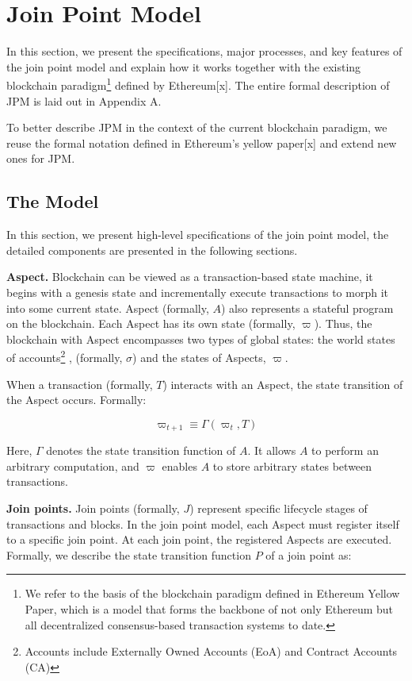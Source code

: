 \section{Join Point Model}

In this section, we present the specifications, major processes, and key features of the join point model and explain how it works together with the existing blockchain paradigm\footnote{We refer to the basis of the blockchain paradigm defined in Ethereum Yellow Paper, which is a model that forms the backbone of not only Ethereum but all decentralized consensus-based transaction systems to date.} defined by Ethereum[x]. The entire formal description of JPM is laid out in Appendix A.

To better describe JPM in the context of the current blockchain paradigm, we reuse the formal notation defined in Ethereum's yellow paper[x] and extend new ones for JPM.

\subsection{The Model}

In this section, we present high-level specifications of the join point model, the detailed components are presented in the following sections.

\textbf{Aspect.} Blockchain can be viewed as a transaction-based state machine, it begins with a genesis state and incrementally execute transactions to morph it into some current state. Aspect (formally, $A$) also represents a stateful program on the blockchain. Each Aspect has its own state (formally, $\varpi$). Thus, the blockchain with Aspect encompasses two types of global states: the world states of accounts\footnote{Accounts include Externally Owned Accounts (EoA) and Contract Accounts (CA)} , (formally,  $\sigma$) and the states of Aspects, $\varpi$. 

When a transaction (formally, $T$) interacts with an Aspect, the state transition of the Aspect occurs. Formally: 

$$
\varpi_{t+1} \equiv \Gamma(\varpi_{t},T) 
$$

Here, $\Gamma$ denotes the state transition function of $A$. It allows $A$ to perform an arbitrary computation, and $\varpi$ enables $A$ to store arbitrary states between transactions. 

\textbf{Join points.} Join points (formally, $J$) represent specific lifecycle stages of transactions and blocks. In the join point model, each Aspect must register itself to a specific join point. At each join point, the registered Aspects are executed. Formally, we describe the state transition function $P$ of a join point as:

